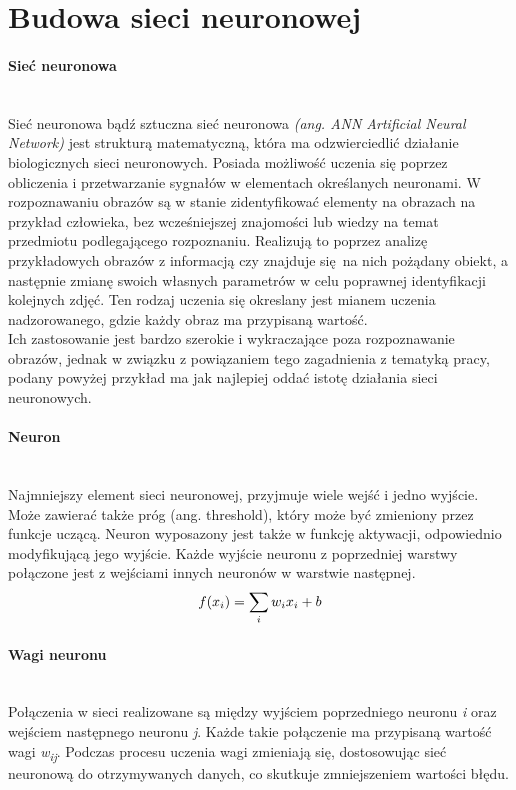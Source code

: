 \section{Budowa sieci neuronowej}

\paragraph{Sieć neuronowa} \mbox{}\\
Sieć neuronowa bądź sztuczna sieć neuronowa \textit{(ang. ANN Artificial Neural Network)}
jest strukturą matematyczną, która ma odzwierciedlić działanie biologicznych sieci
neuronowych. Posiada możliwość uczenia się poprzez obliczenia i przetwarzanie sygnałów
w elementach określanych neuronami. W rozpoznawaniu obrazów są w stanie zidentyfikować
elementy na obrazach na przykład człowieka, bez wcześniejszej znajomości lub wiedzy na
temat przedmiotu podlegającego rozpoznaniu. Realizują to poprzez analizę przykładowych
obrazów z informacją czy znajduje się na nich pożądany obiekt, a następnie zmianę swoich
własnych parametrów w celu poprawnej identyfikacji kolejnych zdjęć. Ten rodzaj uczenia się
okreslany jest mianem uczenia nadzorowanego, gdzie każdy obraz ma przypisaną wartość. \\
Ich zastosowanie jest bardzo szerokie i wykraczające poza rozpoznawanie obrazów, jednak
w związku z powiązaniem tego zagadnienia z tematyką pracy, podany powyżej przykład ma
jak najlepiej oddać istotę działania sieci neuronowych.

\paragraph{Neuron} \mbox{}\\
Najmniejszy element sieci neuronowej, przyjmuje wiele wejść i jedno wyjście. Może
zawierać także próg (ang. threshold), który może być zmieniony przez funkcje uczącą.
Neuron wyposazony jest także w funkcję aktywacji, odpowiednio modyfikującą jego wyjście.
Każde wyjście neuronu z poprzedniej warstwy połączone jest z wejściami innych neuronów
w warstwie następnej.
\begin{equation}
f(x_{i}) = \sum_{i}w_{i}x_{i} + b \\
\end{equation}

\paragraph{Wagi neuronu} \mbox{}\\
Połączenia w sieci realizowane są między wyjściem poprzedniego neuronu \textit{i}
oraz wejściem następnego neuronu \textit{j}. Każde takie połączenie ma przypisaną
wartość wagi \textit{w\textsubscript{ij}}. Podczas procesu uczenia wagi zmieniają
się, dostosowując sieć neuronową do otrzymywanych danych, co skutkuje
zmniejszeniem wartości błędu.

